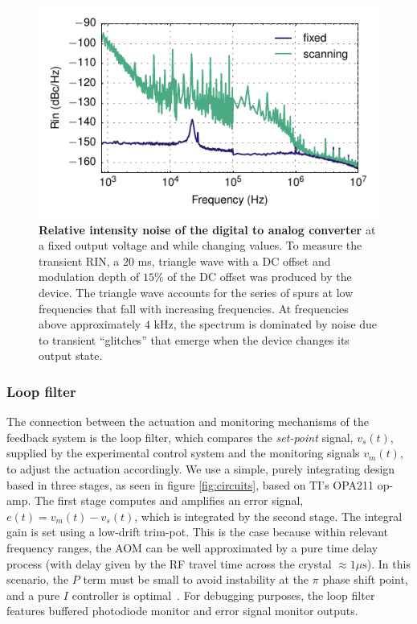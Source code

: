 \documentclass[twocolumn,aps,pra,showpacs,preprintnumbers,bibnotes]{revtex4-1}
\begin{document}
\begin{figure}
  \begin{center}
    \includegraphics{fig/da_rin_scan.pdf}
    \caption{\textbf{Relative intensity noise of the digital to analog converter} at a fixed output voltage and while changing values. To measure the transient RIN, a $20$ ms, triangle wave with a DC offset and modulation depth of $15$\% of the DC offset was produced by the device. The triangle wave accounts for the series of spurs at low frequencies that fall with increasing frequencies. At frequencies above approximately $4$ kHz, the spectrum is dominated by noise due to transient ``glitches'' that emerge when the device changes its output state.}\label{fig:da_rin}
  \end{center}
\end{figure}


\subsubsection{Loop filter}

The connection between the actuation and monitoring mechanisms of the feedback system is the loop filter, which compares the \textit{set-point} signal, $v_s(t)$, supplied by the experimental control system and the monitoring signals $v_m(t)$, to adjust the actuation accordingly.
We use a simple, purely integrating design based in three stages, as seen in figure \ref{fig:circuits}, based on TI's OPA211 op-amp.
The first stage computes and amplifies an error signal, $e(t)=v_m(t)-v_s(t)$, which is integrated by the second stage. 
The integral gain is set using a low-drift trim-pot. 
This is the case because within relevant frequency ranges, the AOM can be well approximated by a pure time delay process (with delay given by the RF travel time across the crystal $\approx 1 \mu\mathrm{s}$).
In this scenario, the $P$ term must be small to avoid instability at the $\pi$ phase shift point, and a pure $I$ controller is optimal~\cite{Skogestad2001}.
For debugging purposes, the loop filter features buffered photodiode monitor and error signal monitor outputs.
\end{document}
